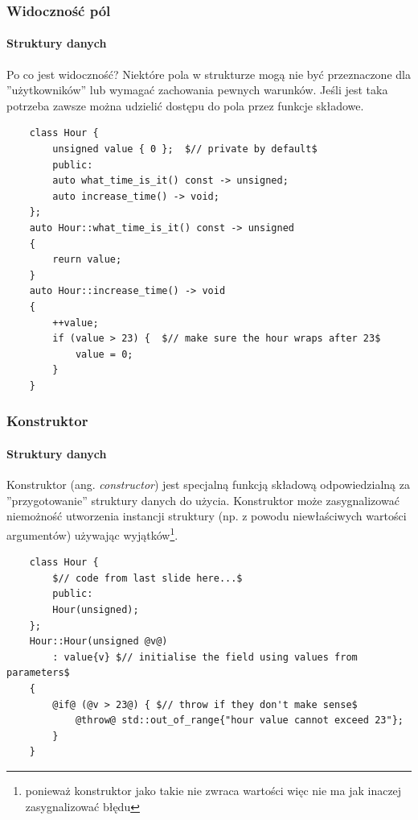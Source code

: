 \documentclass[aspectratio=169,10pt]{beamer}
\begin{document}
\begin{frame}[fragile]
    \frametitle{Widoczność pól}
    \framesubtitle{Struktury danych}

    Po co jest widoczność? Niektóre pola w strukturze mogą nie być przeznaczone
    dla ''użytkowników'' lub wymagać zachowania pewnych warunków. Jeśli jest
    taka potrzeba zawsze można udzielić dostępu do pola przez funkcje składowe.

    {\tiny
    \begin{lstlisting}
    class Hour {
        unsigned value { 0 };  $// private by default$
        public:
        auto what_time_is_it() const -> unsigned;
        auto increase_time() -> void;
    };
    auto Hour::what_time_is_it() const -> unsigned
    {
        reurn value;
    }
    auto Hour::increase_time() -> void
    {
        ++value;
        if (value > 23) {  $// make sure the hour wraps after 23$
            value = 0;
        }
    }
    \end{lstlisting}}
\end{frame}

\begin{frame}[fragile]
    \frametitle{Konstruktor}
    \framesubtitle{Struktury danych}

    Konstruktor (ang. \textit{constructor}) jest specjalną funkcją składową
    odpowiedzialną za ''przygotowanie'' struktury danych do użycia. Konstruktor
    może zasygnalizować niemożność utworzenia instancji struktury (np. z powodu
    niewłaściwych wartości argumentów) używając wyjątków\footnote{ponieważ
    konstruktor jako takie nie zwraca wartości więc nie ma jak inaczej
    zasygnalizować błędu}.

    {\tiny
    \begin{lstlisting}
    class Hour {
        $// code from last slide here...$
        public:
        Hour(unsigned);
    };
    Hour::Hour(unsigned @v@)
        : value{v} $// initialise the field using values from parameters$
    {
        @if@ (@v > 23@) { $// throw if they don't make sense$
            @throw@ std::out_of_range{"hour value cannot exceed 23"};
        }
    }
    \end{lstlisting}}
\end{frame}

\end{document}
